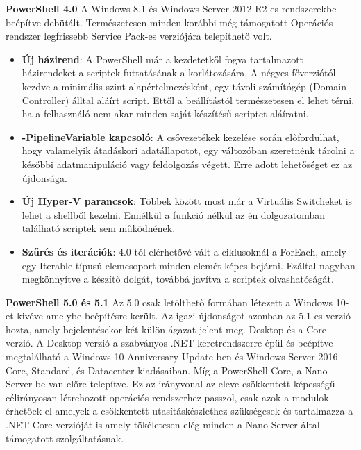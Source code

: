 \documentclass[12pt,oneside,justify,table]{book}
\begin{document}
\noindent\textbf{PowerShell 4.0}
\newline A Windows 8.1 és Windows Server 2012 R2-es rendszerekbe beépítve debütált. Természetesen minden korábbi még támogatott Operációs rendszer legfrissebb Service Pack-es verziójára telepíthető volt.

\begin{itemize}
	\item \textbf{Új házirend}: A PowerShell már a kezdetetkől fogva tartalmazott házirendeket a scriptek futtatásának a korlátozására. A négyes főverziótól kezdve a minimális szint alapértelmezésként, egy távoli számítógép (Domain Controller) álltal aláírt script. Ettől a beállítástól természetesen el lehet térni, ha a felhasználó nem akar minden saját készítésű scriptet aláíratni.
	\item \textbf{-PipelineVariable kapcsoló}: A csővezetékek kezelése során előfordulhat, hogy valamelyik átadáskori adatállapotot, egy változóban szeretnénk tárolni a későbbi adatmanipuláció vagy feldolgozás végett. Erre adott lehetőséget ez az újdonsága.
	\item \textbf{Új Hyper-V parancsok}: Többek között most már a Virtuális Switcheket is lehet a shellből kezelni. Ennélkül a funkció nélkül az én dolgozatomban található scriptek sem működnének.
	\item \textbf{Szűrés és iterációk}: 4.0-tól elérhetővé vált a ciklusoknál a ForEach, amely egy Iterable típusú elemcsoport minden elemét képes bejárni. Ezáltal nagyban megkönnyítve a készítő dolgát, továbbá javítva a scriptek olvashatóságát.
\end{itemize}

\noindent\textbf{PowerShell 5.0 és 5.1}
\newline Az 5.0 csak letölthető formában létezett a Windows 10-et kivéve amelybe beépítésre került. Az igazi újdonságot azonban az 5.1-es verzió hozta, amely bejelentésekor két külön ágazat jelent meg. Desktop és a Core verzió. A Desktop verzió a szabványos .NET keretrendszerre épül és beépítve megtalálható a Windows 10 Anniversary Update-ben és Windows Server 2016 Core, Standard, és Datacenter kiadásaiban. Míg a PowerShell Core, a Nano Server-be van előre telepítve. Ez az irányvonal az eleve csökkentett képességű célirányosan létrehozott operációs rendszerhez passzol, csak azok a modulok érhetőek el amelyek a csökkentett utasításkészlethez szükségesek és tartalmazza a .NET Core verzióját is amely tökéletesen elég minden a Nano Server által támogatott szolgáltatásnak.\\
\end{document}
